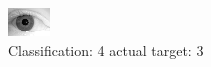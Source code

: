 \begin{figure}[h!]
\begin{center}
\includegraphics[width=0.60\columnwidth]{figures/ID2172_class_4_target_3.png}
\end{center}
\caption{ Classification: 4 actual target: 3}
\label{fig:ID2172_class_4_target_3}
\end{figure}
